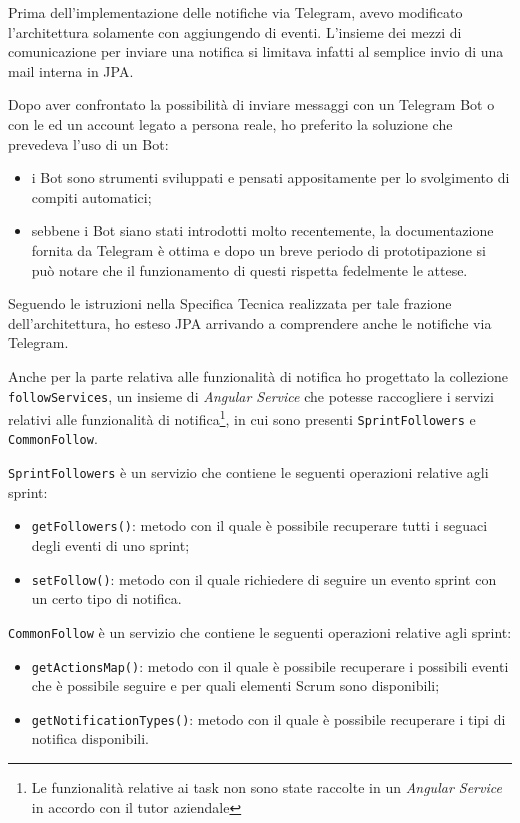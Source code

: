 Prima dell'implementazione delle notifiche via Telegram, avevo modificato
l'architettura solamente con aggiungendo di eventi. L'insieme dei mezzi di
comunicazione per inviare una notifica si limitava infatti al semplice invio
di una mail interna in JPA.

Dopo aver confrontato la possibilità di inviare messaggi con un Telegram Bot o
con le  ed un account legato a persona reale, ho preferito la
soluzione che prevedeva l'uso di un Bot:

\begin{itemize}
\item i Bot sono strumenti sviluppati e pensati appositamente per lo
  svolgimento di compiti automatici;
\item sebbene i Bot siano stati introdotti molto recentemente, la
  documentazione fornita da Telegram è ottima e dopo un breve periodo di
  prototipazione si può notare che il funzionamento di questi rispetta
  fedelmente le attese.
\end{itemize}

Seguendo le istruzioni nella Specifica Tecnica realizzata per tale frazione
dell'architettura, ho esteso JPA arrivando a comprendere anche le notifiche
via Telegram.

Anche per la parte relativa alle funzionalità di notifica ho progettato la
collezione \texttt{followServices}, un insieme di \emph{Angular Service} che
potesse raccogliere i servizi relativi alle funzionalità di
notifica\footnote{Le funzionalità relative ai task non sono state raccolte in
un \emph{Angular Service} in accordo con il tutor aziendale}, in cui sono
presenti \texttt{SprintFollowers} e \texttt{CommonFollow}.

\texttt{SprintFollowers} è un servizio che contiene le seguenti operazioni
relative agli sprint:

\begin{itemize}
\item \texttt{getFollowers()}: metodo con il quale è possibile recuperare
  tutti i seguaci degli eventi di uno sprint;
\item \texttt{setFollow()}: metodo con il quale richiedere di seguire un
  evento sprint con un certo tipo di notifica.
\end{itemize}

\texttt{CommonFollow} è un servizio che contiene le seguenti operazioni
relative agli sprint:

\begin{itemize}
\item \texttt{getActionsMap()}: metodo con il quale è possibile recuperare i
  possibili eventi che è possibile seguire e per quali elementi Scrum sono
  disponibili;
\item \texttt{getNotificationTypes()}: metodo con il quale è possibile
  recuperare i tipi di notifica disponibili.
\end{itemize}

